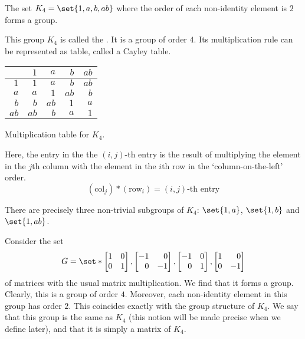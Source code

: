 \documentclass[11pt]{penrose}
\begin{document}
\begin{nthm}
    The set $K_4 = \set{1, a, b, ab}$ where the order of each non-identity element is $2$ forms a group.
\end{nthm}

This group $K_4$ is called the . It is a group of order $4$. Its multiplication rule can be represented as table, called a Cayley table.
\begin{center}
    \begin{tabularx}{0.3\textwidth}{|R||R|R|R|R|}
        \hline
             & $ 1$ & $ a$ & $ b$ & $ab$ \\ \hline\hline
        $ 1$ & $ 1$ & $ a$ & $ b$ & $ab$ \\ \hline
        $ a$ & $ a$ & $ 1$ & $ab$ & $ b$ \\ \hline
        $ b$ & $ b$ & $ab$ & $ 1$ & $ a$ \\ \hline
        $ab$ & $ab$ & $ b$ & $ a$ & $ 1$ \\ \hline
    \end{tabularx}

    {Multiplication table for $K_4$.}
\end{center}

Here, the entry in the the $(i,j)$-th entry is the result of multiplying the element in the $j$th column with the element in the $i$th row in the `column-on-the-left' order.
\begin{equation*}
    (\text{col}_j) * (\text{row}_i) = (i,j)\text{-th entry}
\end{equation*}

There are precisely three non-trivial subgroups of $K_4$: $\set{1, a}$, $\set{1, b}$ and $\set{1, ab}$.

Consider the set
\begin{equation*}
    G = \set*{
    \begin{bmatrix*}[r]1 & 0\\ 0 & 1\end{bmatrix*},
    \begin{bmatrix*}[r]-1 & 0\\ 0 &-1\end{bmatrix*},
    \begin{bmatrix*}[r]-1 & 0\\0 & 1\end{bmatrix*},
    \begin{bmatrix*}[r]1 & 0\\0 & -1\end{bmatrix*} }
\end{equation*}
of matrices with the usual matrix multiplication. We find that it forms a group. Clearly, this is a group of order $4$. Moreover, each non-identity element in this group has order $2$. This coincides exactly with the group structure of $K_4$. We say that this group is the same as $K_4$ (this notion will be made precise when we define  later), and that it is simply a matrix  of $K_4$.
\end{document}
